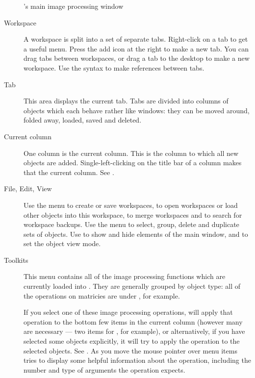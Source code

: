 \begin{figure}
\caption{\nip{}'s main image processing window}
\end{figure}

\begin{description}

\item[Workspace]
A workspace is split into a set of separate tabs. Right-click on a tab to get
a useful menu. Press the add icon at the right to make a new tab. You can drag
tabs between workspaces, or drag a tab to the desktop to make a new workspace. 
Use the syntax  to make references between tabs.

\item[Tab]
This area displays the current tab.
Tabs are divided into columns of
objects which each behave rather like windows: they can be moved around,
folded away, loaded, saved and deleted. 

\item[Current column]
One column is the current column. This is the column to
which all new objects are added. Single-left-clicking on the title bar of
a column makes that the current column. See .

\item[File, Edit, View]
Use the  menu to create or save work\-spaces, to open workspaces
or load other objects into this workspace, to merge workspaces and to search
for workspace backups.  Use the  menu to select, group, delete and
duplicate sets of objects.  Use  to show and hide elements of the
main window, and to set the object view mode.

\item[Toolkits]
This menu contains all of the image processing functions which are currently
loaded into \nip{}. They are generally grouped by object type: all of the
operations on matricies are under , for example.

If you select one of these image processing operations, \nip{} will apply
that operation to the bottom few items in the current column (however many are
necessary --- two items for , for example),
or alternatively, if you have selected some objects explicitly, it will try
to apply the operation to the selected objects. See . As
you move the mouse pointer over menu items \nip{} tries to display some
helpful information about the operation, including the number and type of
arguments the operation expects.


\end{description}

